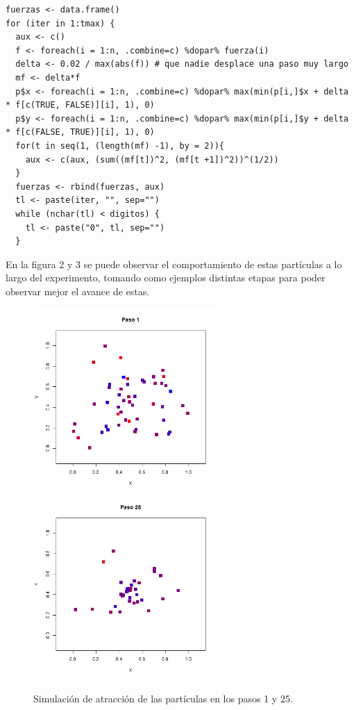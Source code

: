 \documentclass{article}
\begin{document}
\begin{lstlisting}[frame=single]
fuerzas <- data.frame()
for (iter in 1:tmax) {
  aux <- c()
  f <- foreach(i = 1:n, .combine=c) %dopar% fuerza(i)
  delta <- 0.02 / max(abs(f)) # que nadie desplace una paso muy largo
  mf <- delta*f
  p$x <- foreach(i = 1:n, .combine=c) %dopar% max(min(p[i,]$x + delta * f[c(TRUE, FALSE)][i], 1), 0)
  p$y <- foreach(i = 1:n, .combine=c) %dopar% max(min(p[i,]$y + delta * f[c(FALSE, TRUE)][i], 1), 0)
  for(t in seq(1, (length(mf) -1), by = 2)){
    aux <- c(aux, (sum((mf[t])^2, (mf[t +1])^2))^(1/2))
  }
  fuerzas <- rbind(fuerzas, aux)
  tl <- paste(iter, "", sep="")
  while (nchar(tl) < digitos) {
    tl <- paste("0", tl, sep="")
  }
\end{lstlisting}
En la figura 2 y 3 se puede observar el comportamiento de estas partículas a lo largo del experimento, tomando como ejemplos distintas etapas para poder observar mejor el avance de estas.
\begin{figure}[H]
\centering
\includegraphics[width=7cm]{p9_t001.png}  \includegraphics[width=7cm]{p9_t025.png} 
\caption{Simulación de atracción de las partículas en los pasos 1 y 25.}
\end{figure}
\end{document}
